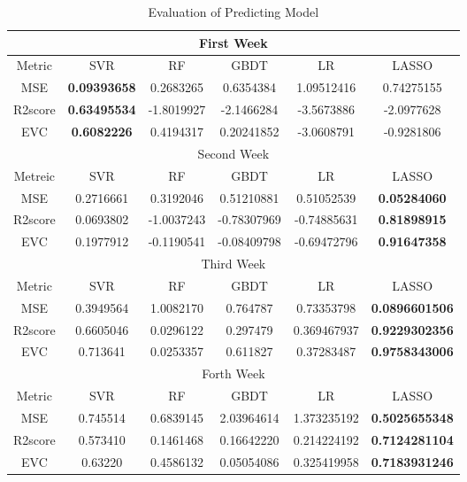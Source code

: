 \begin{table*}[!htbp]
\centering
\begin{tabular}{|c|c|c|c|c|c|}
\hline
\multicolumn{6}{|c|}{First Week}\\
\hline
Metric&SVR&RF&GBDT&LR&LASSO\\
\hline
MSE& \textbf{0.09393658}& 0.2683265 & 0.6354384 & 1.09512416 & 0.74275155\\
\hline
R2score & \textbf{0.63495534} &  -1.8019927	& -2.1466284&-3.5673886&-2.0977628\\
\hline
EVC&\textbf{0.6082226}&0.4194317&0.20241852&-3.0608791&-0.9281806\\
\hline
\multicolumn{6}{|c|}{Second Week}\\
\hline
Metreic & SVR&RF&GBDT&LR&LASSO\\
\hline
MSE&0.2716661&0.3192046&0.51210881&0.51052539&\textbf{0.05284060}\\
\hline
R2score&0.0693802&-1.0037243&-0.78307969&-0.74885631&\textbf{0.81898915}\\
\hline
EVC&0.1977912&-0.1190541&-0.08409798&-0.69472796&\textbf{0.91647358}\\
\hline
\multicolumn{6}{|c|}{Third Week}\\
\hline
Metric&SVR&RF&GBDT&LR&LASSO\\
\hline
MSE&0.3949564&1.0082170&0.764787&0.73353798&\textbf{0.0896601506}\\
\hline
R2score&0.6605046&0.0296122&0.297479&0.369467937&\textbf{0.9229302356}\\
\hline
EVC&0.713641&0.0253357&0.611827&0.37283487&\textbf{0.9758343006}\\
\hline
\multicolumn{6}{|c|}{Forth Week}\\
\hline
Metric&SVR&RF&GBDT&LR&LASSO\\
\hline
MSE&0.745514&0.6839145&2.03964614&1.373235192&\textbf{0.5025655348}\\
\hline
R2score&0.573410&0.1461468&0.16642220&0.214224192&\textbf{0.7124281104}\\
\hline
EVC&0.63220&0.4586132&0.05054086&0.325419958&\textbf{0.7183931246}\\
\hline
\end{tabular}
\caption{Evaluation of Predicting Model}
\label{tab:evalution}
\end{table*}


